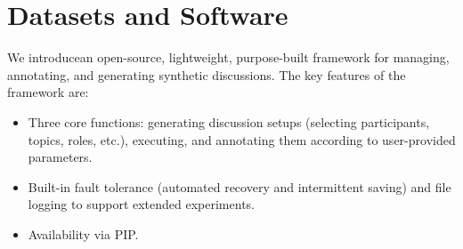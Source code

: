 \section{Datasets and Software}
\label{sec:data-soft}

We introduce\syndisco\syndiscolink an open-source, lightweight, purpose-built framework for managing, annotating, and generating synthetic discussions. The key features of the framework are: 
\begin{itemize}[nosep, noitemsep]
    \item Three core functions: generating discussion setups (selecting participants, topics, roles, etc.), executing, and annotating them according to user-provided parameters.
    \item  Built-in fault tolerance (automated recovery and intermittent saving) and file logging to support extended experiments.
    \item Availability via PIP\pip.
\end{itemize}
